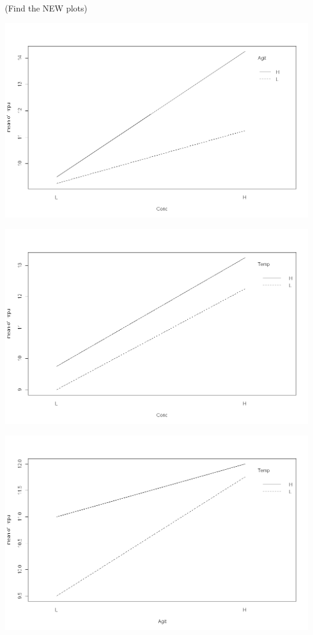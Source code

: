 \documentclass[a4paper,12pt]{article}
\begin{document}
\newpage
(Find the NEW plots)
\begin{center}
	\includegraphics[scale=0.24]{image/ExamQ6interactiona}
\end{center}
\begin{center}
	\includegraphics[scale=0.24]{image/ExamQ6interactionb}
\end{center}
\begin{center}
	\includegraphics[scale=0.24]{image/ExamQ6interactionc}
\end{center}
\end{document}
